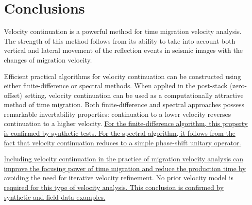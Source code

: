 
\begin{comment}
Without repeating the details of the procedure, Figures~\ref{fig:pck}
and \ref{fig:img} show picked imaging velocities and the velocity
continuation image for the Blake Outer Ridge data, shown in many other
papers in this report.

\plot{pck}{width=6in,height=3.5in}{Blake Outer Ridge data. Automatic
  picks of 2-D imaging velocity after velocity continuation. The contour
  spacing is 0.01 km/s, starting from 1.5 km/s.}

\plot{img}{angle=90,totalheight=8.5in,width=6in}{Blake Outer Ridge
  data. Final result of velocity continuation: seismic image, obtained
  by slicing through the velocity cube.}
\end{comment}

\section{Conclusions}

Velocity continuation is a powerful method for time migration velocity
analysis.  The strength of this method follows from its ability to take into
account both vertical and lateral movement of the reflection events in seismic
images with the changes of migration velocity.

Efficient practical algorithms for velocity continuation can be constructed
using either finite-difference or spectral methods. When applied in the
post-stack (zero-offset) setting, velocity continuation can be used as a
computationally attractive method of time migration. Both finite-difference
and spectral approaches possess remarkable invertability properties:
continuation to a lower velocity reverses continuation to a higher velocity.
\uline{For the finite-difference algorithm, this property is confirmed by synthetic
tests. For the spectral algorithm, it follows from the fact that velocity
continuation reduces to a simple phase-shift unitary operator.}

\uline{Including velocity continuation in the practice of migration velocity analysis
can improve the focusing power of time migration and reduce the production
time by avoiding the need for iterative velocity refinement. No prior velocity
model is required for this type of velocity analysis. This conclusion is
confirmed by synthetic and field data examples.}

